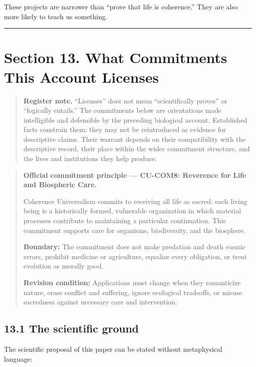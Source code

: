\documentclass[
  11pt,
]{article}
\begin{document}
These projects are narrower than ``prove that life is coherence.'' They
are also more likely to teach us something.

\begin{center}\rule{0.5\linewidth}{0.5pt}\end{center}

\section{Section 13. What Commitments This Account
Licenses}\label{section-13.-what-commitments-this-account-licenses}

\begin{quote}
\textbf{Register note.} ``Licenses'' does not mean ``scientifically
proves'' or ``logically entails.'' The commitments below are
orientations made intelligible and defensible by the preceding
biological account. Established facts constrain them; they may not be
reintroduced as evidence for descriptive claims. Their warrant depends
on their compatibility with the descriptive record, their place within
the wider commitment structure, and the lives and institutions they help
produce.
\end{quote}

\begin{quote}
\textbf{Official commitment principle --- CU-COM8: Reverence for Life
and Biospheric Care.}

Coherence Universalism commits to receiving all life as sacred: each
living being is a historically formed, vulnerable organization in which
material processes contribute to maintaining a particular continuation.
This commitment supports care for organisms, biodiversity, and the
biosphere.

\textbf{Boundary:} The commitment does not make predation and death
cosmic errors, prohibit medicine or agriculture, equalize every
obligation, or treat evolution as morally good.

\textbf{Revision condition:} Applications must change when they
romanticize nature, erase conflict and suffering, ignore ecological
tradeoffs, or misuse sacredness against necessary care and intervention.
\end{quote}

\subsection{13.1 The scientific ground}\label{the-scientific-ground}

The scientific proposal of this paper can be stated without metaphysical
language:
\end{document}
